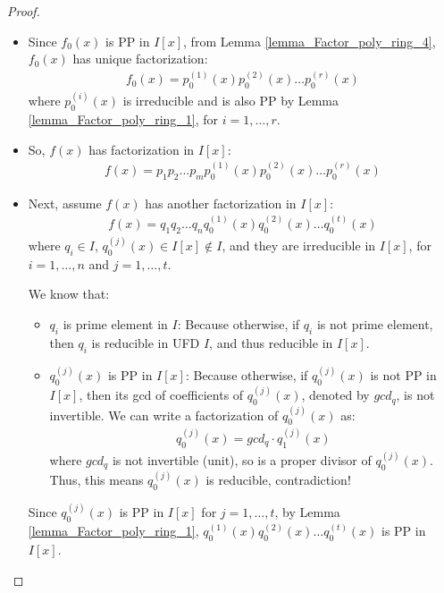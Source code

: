 \documentclass[utf8]{ctexbook}
\theoremstyle{definition}
\begin{document}
\begin{proof}
\begin{enumerate}
{\begin{itemize}
{Since $d \in I$, $d$ is not invertible and $d\neq 0$, by $I$ is UFD, $d$ has unique factorization:
\begin{align*}
d = p_1 p_2 \ldots p_m
\end{align*}
where $p_i$ is prime element of $I$, $i=1, \ldots, m$.
}
\item{
Since $f_0 (x)$ is PP in $I[x]$, from Lemma \ref{lemma_Factor_poly_ring_4}, $f_0 (x)$ has unique factorization:
\begin{align*}
f_0 (x) = p_0 ^{(1)} (x) p_0 ^{(2)} (x) \ldots p_0 ^{(r)} (x) 
\end{align*}
where $p_0 ^{(i)} (x) $ is irreducible and is also PP by Lemma \ref{lemma_Factor_poly_ring_1}, for $i= 1, \ldots, r$.
}
\item{
So, $f(x)$ has factorization in $I[x]$:
\begin{align*}
f(x) = p_1 p_2 \ldots p_m p_0 ^{(1)} (x) p_0 ^{(2)} (x) \ldots p_0 ^{(r)} (x) 
\end{align*}
}
\item{Next, assume $f(x)$ has another factorization in $I[x]$:
\begin{align*}
f(x) = q_1 q_2 \ldots q_n q_0 ^{(1)} (x) q_0 ^{(2)} (x) \ldots q_0 ^{(t)} (x) 
\end{align*}
where $q_i \in I$, $q_0 ^{(j)} (x) \in I[x] \not \in I $, and they are irreducible in $I[x]$, for $i = 1, \ldots, n$ and $j = 1, \ldots, t$.

We know that:
\begin{itemize}
\item{$q_i$ is prime element in $I$: Because otherwise, if $q_i$ is not prime element, then $q_i$ is reducible in UFD $I$, and thus reducible in $I[x]$.}
\item{$q_0 ^{(j)} (x)$ is PP in $I[x]$: Because otherwise, if $q_0 ^{(j)} (x)$ is not PP in $I[x]$, then its gcd of coefficients of $ q_0 ^{(j)} (x)$, denoted by $ gcd_q $, is not invertible. We can write a factorization of $q_0 ^{(j)} (x)$ as:
\begin{align*}
q_0 ^{(j)} (x) = gcd_q \cdot q_1 ^{(j)} (x)
\end{align*}
where $ gcd_q $ is not invertible (unit), so is a proper divisor of $q_0 ^{(j)} (x)$. Thus, this means $q_0 ^{(j)} (x)$ is reducible, contradiction!
}
\end{itemize}

Since $q_0 ^{(j)} (x)$ is PP in $I[x]$ for $j = 1, \ldots, t$, by Lemma \ref{lemma_Factor_poly_ring_1}, $q_0 ^{(1)} (x) q_0 ^{(2)} (x) \ldots q_0 ^{(t)} (x) $ is PP in $I[x]$.

}
\end{itemize}}
\end{enumerate}
\end{proof}
\end{document}
